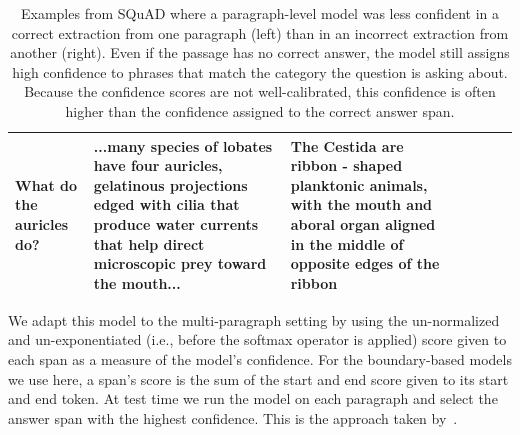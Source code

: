 \documentclass[11pt,a4paper]{article}
\begin{document}
\begin{table}
\begin{small}
\begin{center}
\begin{tabular}{ | l | l | l | c | l | l | c |}
\hline
\parbox{3cm}{What do the auricles do?} &\parbox{5.7cm}{...many species of lobates have four auricles, gelatinous projections edged with cilia that \textbf{produce water currents that help direct microscopic prey toward the mouth}...} & \parbox{5.7cm}{The Cestida are ribbon - shaped planktonic animals, with the mouth and aboral \textbf{organ aligned in the middle of opposite edges of the ribbon}} \\[0.6cm]	

\hline

\end{tabular}
\end{center}
\end{small}
\caption{Examples from SQuAD where a paragraph-level model was less confident in a correct extraction from one paragraph (left) than in an incorrect extraction from another (right). Even if the passage has no correct answer, the model still assigns high confidence to phrases that match the category the question is asking about. Because the confidence scores are not well-calibrated, this confidence is often higher than the confidence assigned to the correct answer span.}
\label{table:qualitative_results}
\end{table}
 
We adapt this model to the multi-paragraph setting by using the un-normalized and un-exponentiated (i.e., before the softmax operator is applied) score given to each span as a measure of the model's confidence. For the boundary-based models we use here, a span's score is the sum of the start and end score given to its start and end token. At test time we run the model on each paragraph and select the answer span with the highest confidence. This is the approach taken by~\citet{openqa}. 
\end{document}
